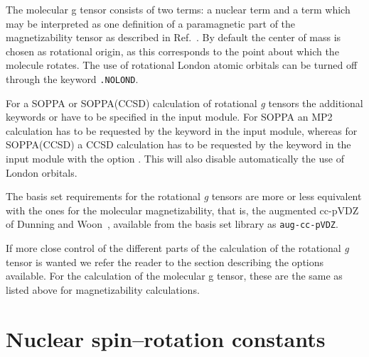 The molecular g tensor consists of two terms: a nuclear term and a
term which may be interpreted as one definition of a paramagnetic part
of the magnetizability tensor as
described in Ref.~\cite{jgkrthjcp105}.
By default the center of mass is chosen as
rotational origin, as this corresponds to the point about which the
molecule rotates. The use of
rotational London atomic 
orbitals can be turned off through
the keyword \verb|.NOLOND|.

For a SOPPA or SOPPA(CCSD) calculation of
rotational  {\em g} tensors the additional keywords  or
 have to be specified in the  input
module. For SOPPA an MP2 calculation has to be requested by the keyword
 in the  input module, whereas for SOPPA(CCSD) a
CCSD calculation has to be requested by the keyword  in the  input module with the  option
. This will also disable automatically the use of London
orbitals. 
 
The basis set requirements for the rotational {\em g} tensors are more or
less equivalent with the ones for the molecular magnetizability,
that is, the augmented cc-pVDZ of Dunning and
Woon~\cite{thdjcp90,dewthdjcp98}, available from the basis set library
as \verb|aug-cc-pVDZ|.

If more close control of the different parts of the calculation of the
rotational {\em g}  tensor is wanted we refer the reader to the section
describing the options available. For the calculation of the molecular
g tensor, these are the same as listed above for magnetizability
calculations.

\section{Nuclear spin--rotation constants}\label{sec:spinrotasjon}

\begin{center}
\end{center}



